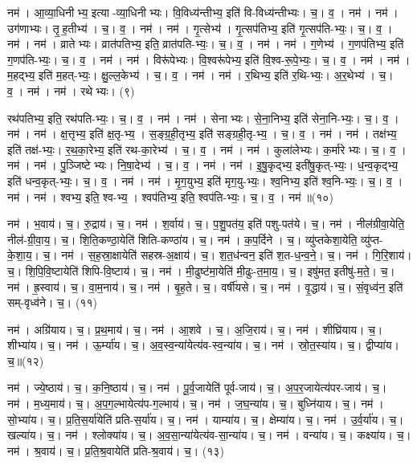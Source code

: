 नम॑। आ॒व्या॒धिनीभ्य॒ इत्या-व्या॒धिनीभ्यः। वि॒विध्य॑न्तीभ्य॒ इति॑ वि-विध्य॑न्तीभ्यः। च॒। व॒। नम॑। नम॑। उग॑णाभ्यः। तृ॒ह॒तीभ्य॑। च॒। व॒। नम॑। 
नम॑। गृ॒त्सेभ्य॑। गृ॒त्सप॑तिभ्य॒ इति॑ गृ॒त्सप॑ति-भ्यः॒। च॒। व॒। नम॑। 
नम॑। व्रातेभ्यः। व्रात॑पतिभ्य॒ इति॒ व्रात॑पति-भ्यः॒। च॒। व॒। नम॑। 
नम॑। ग॒णेभ्य॑। ग॒णप॑तिभ्य॒ इति॑ ग॒णप॑ति-भ्यः॒। च॒। व॒। नम॑। 
नम॑। विरू॑पेभ्यः। वि॒श्वरू॑पेभ्य॒ इति॑ वि॒श्व-रू॒पे॒भ्यः॒। च॒। व॒। नम॑। 
नम॑। म॒हद्भ्य॒ इति॑ म॒हत्-भ्यः॒। क्षु॒ल्ल॒केभ्य॑। च॒। व॒। नम॑। 
नम॑। र॒थिभ्य॒ इति॑ र॒थि-भ्यः॒। अ॒र॒थेभ्य॑। च॒। व॒। नम॑। 
नम॑। रथेभ्यः। (९)


रथ॑पतिभ्य॒ इति॒ रथ॑पति-भ्यः॒। च॒। व॒। नम॑। 
नम॑। सेनाभ्यः। से॒ना॒निभ्य॒ इति॑ सेना॒नि-भ्यः॒। च॒। व॒। नम॑। 
नम॑। क्ष॒त्तृभ्य॒ इति॑ क्ष॒तृ-भ्य॒। स॒ङ्ग्र॒ही॒तृभ्य॒ इति॑ सङ्ग्रही॒तृ-भ्य॒। च॒। व॒। नम॑। 
नम॑। तक्ष॑भ्य॒ इति॑ तक्ष॑-भ्यः॒। र॒थ॒का॒रेभ्य॒ इति॑ रथ-का॒रेभ्य॑। च॒। व॒। नम॑। 
नम॑। कुला॑लेभ्यः। क॒र्मारेभ्यः। च॒। व॒। नम॑। 
नम॑। पु॒ञ्जिष्टेभ्यः। नि॒षा॒देभ्य॑। च॒। व॒। नम॑। 
नम॑। इ॒षु॒कृद्भ्य॒ इती॑षु॒कृत्-भ्यः॒। ध॒न्व॒कृद्भ्य॒ इति॑ धन्व॒कृत्-भ्यः॒। च॒। व॒। नम॑। 
नम॑। मृ॒ग॒युभ्य॒ इति॑ मृग॒यु-भ्यः॒। श्व॒निभ्य॒ इति॑ श्व॒नि-भ्यः॒। च॒। व॒। नम॑। 
नम॑। श्वभ्य॒ इति॒ श्व-भ्य॒। श्वप॑तिभ्य॒ इति॒ श्वप॑ति-भ्यः॒। च॒। व॒। नम॑॥(१०)


नम॑। भ॒वाय॑। च॒। रु॒द्राय॑। च॒। 
नम॑। श॒र्वाय॑। च॒। प॒शु॒पत॑य॒ इति॑ पशु-पत॑ये। च॒। 
नम॑। नील॑ग्रीवा॒येति॒ नील॑-ग्री॒वा॒य॒। च॒। शि॒ति॒कण्ठा॒येति॑ शिति-कण्ठा॑य। च॒। 
नम॑। क॒प॒र्दिने। च॒। व्यु॑प्तकेशा॒येति॒ व्यु॑प्त-के॒शा॒य॒। च॒। 
नम॑। स॒ह॒स्रा॒क्षायेति॑ सहस्र-अ॒क्षाय॑। च॒। श॒त॒ध॑न्वन॒ इति॑ श॒त-ध॒न्व॒ने॒। च॒। 
नम॑। गि॒रि॒शाय॑। च॒। शि॒पि॒वि॒ष्टायेति॑ शिपि-वि॒ष्टाय॑। च॒। 
नम॑। मी॒ढुष्ट॑मा॒येति॑ मी॒ढुः-त॒मा॒य॒। च॒। इषु॑मत॒ इतीषु॑-म॒ते॒। च॒। 
नम॑। ह्र॒स्वाय॑। च॒। वा॒म॒नाय॑। च॒। 
नम॑। बृ॒ह॒ते। च॒। वर्षी॑यसे। च॒। 
नम॑। वृ॒द्धाय॑। च॒। सं॒वृध्व॑न॒ इति॑ सम्-वृध्व॑ने। च॒। (११)


नम॑। अग्रि॑याय। च॒। प्र॒थ॒माय॑। च॒। 
नम॑। आ॒शवे। च॒। अ॒जि॒राय॑। च॒। 
नम॑। शीघ्रि॑याय। च॒। शीभ्या॑य। च॒। 
नम॑। ऊ॒र्म्या॑य। च॒। अ॒व॒स्व॒न्या॑येत्य॑व-स्व॒न्या॑य। च॒। 
नम॑। स्रो॒त॒स्या॑य। च॒। द्वीप्या॑य। च॒॥(१२)


नम॑। ज्ये॒ष्ठाय॑। च॒। क॒नि॒ष्ठाय॑। च॒। 
नम॑। पू॒र्व॒जायेति॑ पूर्व-जाय॑। च॒। अ॒प॒र॒जायेत्य॑पर-जाय॑। च॒। 
नम॑। म॒ध्य॒माय॑। च॒। अ॒प॒ग॒ल्भायेत्य॑प-ग॒ल्भाय॑। च॒। 
नम॑। ज॒घ॒न्या॑य। च॒। बुध्नि॑याय। च॒। 
नम॑। सो॒भ्या॑य। च॒। प्र॒ति॒स॒र्या॑येति॑ प्रति-स॒र्या॑य। च॒। 
नम॑। याम्या॑य। च॒। क्षेम्या॑य। च॒। 
नम॑। उ॒र्व॒र्या॑य। च॒। खल्या॑य। च॒। 
नम॑। श्लोक्या॑य। च॒। अ॒व॒सा॒न्या॑येत्य॑व-सा॒न्या॑य। च॒। 
नम॑। वन्या॑य। च॒। कक्ष्या॑य। च॒। 
नम॑। श्र॒वाय॑। च॒। प्र॒ति॒श्र॒वायेति॑ प्रति-श्र॒वाय॑। च॒। (१३)


